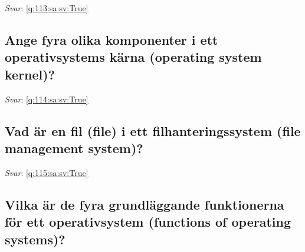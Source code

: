 \documentclass[a4paper,11pt,oneside]{article}
\begin{document}
\begin{sloppypar}
\label{q:113:sa:sv:False}

\vspace{2cm}

\noindent\makebox[\textwidth]{\hrulefill}

\vspace{1cm}

\textit{Svar}: \autoref{q:113:sa:sv:True}



\subsection{Ange fyra olika komponenter i ett operativsystems k\"arna (operating system kernel)?}

\label{q:114:sa:sv:False}

\vspace{2cm}

\noindent\makebox[\textwidth]{\hrulefill}

\vspace{1cm}

\textit{Svar}: \autoref{q:114:sa:sv:True}



\subsection{Vad \"ar en fil (file) i ett filhanteringssystem (file management system)?}

\label{q:115:sa:sv:False}

\vspace{2cm}

\noindent\makebox[\textwidth]{\hrulefill}

\vspace{1cm}

\textit{Svar}: \autoref{q:115:sa:sv:True}



\subsection{Vilka \"ar de fyra grundl\"aggande funktionerna f\"or ett operativsystem (functions of operating systems)?}

\label{q:116:sa:sv:False}

\vspace{2cm}

\noindent\makebox[\textwidth]{\hrulefill}

\vspace{1cm}


\end{sloppypar}
\end{document}
